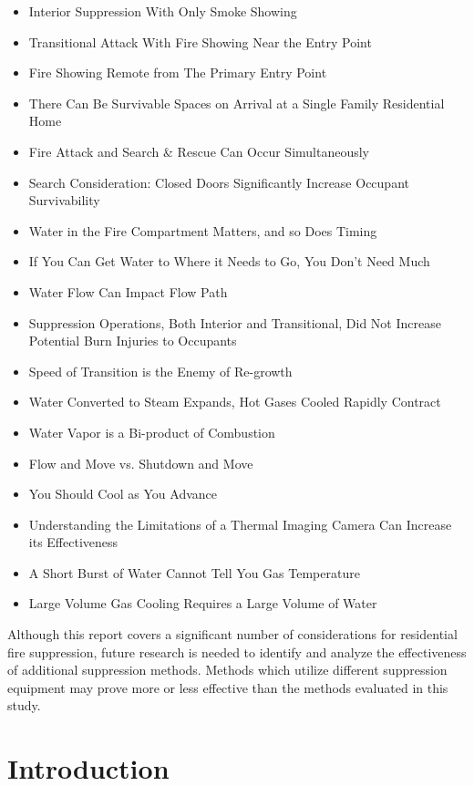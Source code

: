 \documentclass[12pt,oneside]{book}
\begin{document}
\begin{itemize}
	\item Interior Suppression With Only Smoke Showing
	\item Transitional Attack With Fire Showing Near the Entry Point
	\item Fire Showing Remote from The Primary Entry Point
	\item There Can Be Survivable Spaces on Arrival at a Single Family Residential Home
	\item Fire Attack and Search \& Rescue Can Occur Simultaneously
	\item Search Consideration: Closed Doors Significantly Increase Occupant Survivability
	\item Water in the Fire Compartment Matters, and so Does Timing
	\item If You Can Get Water to Where it Needs to Go, You Don’t Need Much
	\item Water Flow Can Impact Flow Path
	\item Suppression Operations, Both Interior and Transitional, Did Not Increase Potential Burn Injuries to Occupants
	\item Speed of Transition is the Enemy of Re-growth
	\item Water Converted to Steam Expands, Hot Gases Cooled Rapidly Contract
	\item Water Vapor is a Bi-product of Combustion
	\item Flow and Move vs. Shutdown and Move
	\item You Should Cool as You Advance
	\item Understanding the Limitations of a Thermal Imaging Camera Can Increase its Effectiveness
	\item A Short Burst of Water Cannot Tell You Gas Temperature
	\item Large Volume Gas Cooling Requires a Large Volume of Water
\end{itemize}

Although this report covers a significant number of considerations for residential fire suppression, future research is needed to identify and analyze the effectiveness of additional suppression methods. Methods which utilize different suppression equipment may prove more or less effective than the methods evaluated in this study.

\newpage

\newpage

\chapter*{Introduction}
\end{document}
